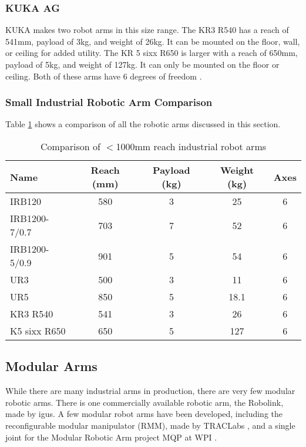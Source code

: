 \subsubsection{KUKA AG}
KUKA makes two robot arms in this size range. The KR3 R540 has a reach of 541mm, payload of 3kg, and weight of 26kg. It can be mounted on the floor, wall, or ceiling for added utility. The KR 5 sixx R650 is larger with a reach of 650mm, payload of 5kg, and weight of 127kg. It can only be mounted on the floor or ceiling. Both of these arms have 6 degrees of freedom \cite{RobotWorx}.

\subsubsection{Small Industrial Robotic Arm Comparison}
Table \ref{tab:ArmComparison} shows a comparison of all the robotic arms discussed in this section.
\begin{table} [H]
	\centering
	\begin{tabular}{| l | c | c | c | c |}
		\hline
		\textbf{Name} & \textbf{Reach (mm)} & \textbf{Payload (kg)} & \textbf{Weight (kg)} & \textbf{Axes} \\
		\hline
		IRB120 & 580 & 3 & 25 & 6 \\
		IRB1200-7/0.7 & 703 & 7 & 52 & 6 \\
		IRB1200-5/0.9 & 901 & 5 & 54 & 6 \\
		UR3 & 500 & 3 & 11 & 6 \\
		UR5 & 850 & 5 & 18.1 & 6 \\
		KR3 R540 & 541 & 3 & 26 & 6 \\
		K5 sixx R650 & 650 & 5 & 127 & 6 \\
		\hline
	\end{tabular}
	\caption{Comparison of $<$1000mm reach industrial robot arms}
	\label{tab:ArmComparison}
\end{table}

\subsection{Modular Arms}
While there are many industrial arms in production, there are very few modular robotic arms. There is one commercially available robotic arm, the Robolink, made by igus. A few modular robot arms have been developed, including the reconfigurable modular manipulator (RMM), made by TRACLabs \cite{RMM}, and a single joint for the Modular Robotic Arm project MQP at WPI \cite{MRA}.

